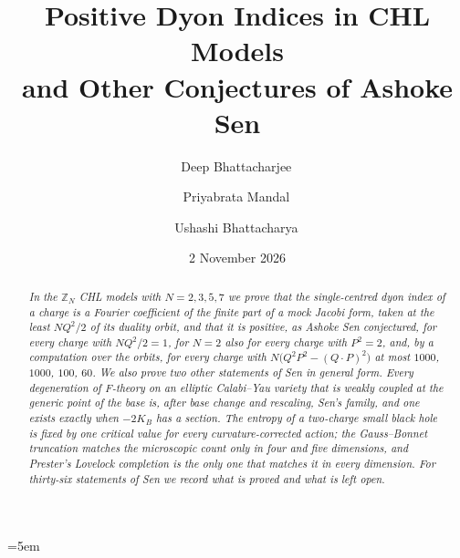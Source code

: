 \documentclass[11pt,a4paper,reqno]{amsart}
\title[Positive Dyon Indices and Conjectures of Ashoke Sen]{Positive Dyon Indices in CHL Models\\ and Other Conjectures of Ashoke Sen}
\author{Deep Bhattacharjee\,\orcidlink{0000-0003-0466-750X}}
\author{Priyabrata Mandal\,\orcidlink{0000-0001-6472-6239}}
\author{Ushashi Bhattacharya\,\orcidlink{0009-0002-2254-3914}}
\date{2 November 2026}
\theoremstyle{plain}
\theoremstyle{definition}
\newcommand{\ZZ}{\mathbb{Z}}
\begin{document}
\begin{abstract}
\itshape
In the $\ZZ_N$ CHL models with $N=2,3,5,7$ we prove that the single-centred dyon index of a charge is a Fourier coefficient of the finite part of a mock Jacobi form, taken at the least $NQ^2/2$ of its duality orbit, and that it is positive, as Ashoke Sen conjectured, for every charge with $NQ^2/2=1$, for $N=2$ also for every charge with $P^2=2$, and, by a computation over the orbits, for every charge with $N\big(Q^2P^2-(Q\cdot P)^2\big)$ at most $1000$, $1000$, $100$, $60$. We also prove two other statements of Sen in general form. Every degeneration of F-theory on an elliptic Calabi--Yau variety that is weakly coupled at the generic point of the base is, after base change and rescaling, Sen's family, and one exists exactly when $-2K_B$ has a section. The entropy of a two-charge small black hole is fixed by one critical value for every curvature-corrected action; the Gauss--Bonnet truncation matches the microscopic count only in four and five dimensions, and Prester's Lovelock completion is the only one that matches it in every dimension. For thirty-six statements of Sen we record what is proved and what is left open.
\end{abstract}

\maketitle
















\appendix









\begingroup\sloppy\emergencystretch=5em\endgroup
\end{document}
